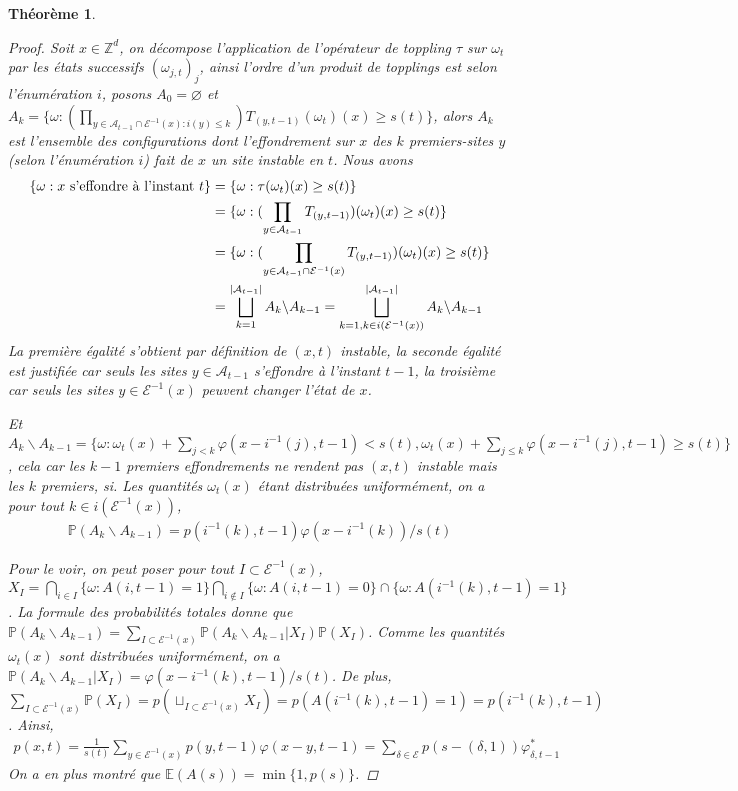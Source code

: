 \documentclass{article}
\newtheorem{theorem}{Théorème}[section]
\begin{document}
\begin{theorem}
\begin{proof}
Soit $x\in\mathbb{Z}^d$, on décompose l'application de l'opérateur de toppling $\tau$ sur $\omega_{t}$ par les états successifs $(\omega_{j,t})_j$, ainsi l'ordre d'un produit de topplings est selon l'énumération $i$, posons $A_0 = \varnothing$ et $A_k = \{\omega : (\prod_{y\in\mathcal{A}_{t-1}\cap\mathcal{E}^{-1}(x) : i(y)\leq k}){T_{(y,t-1)}}(\omega_{t})(x)\geq s(t)\}$, alors $A_k$ est l'ensemble des configurations dont l'effondrement sur $x$ des $k$ premiers-sites $y$ (selon l'énumération $i$) fait de $x$ un site instable en $t$. Nous avons
	\begin{align*}
		\{\omega : x\textup{ s'effondre à l'instant } t\} &= \{\omega : \tau(\omega_t)(x)\geq s(t)\}\\
								  &=\{\omega : (\prod_{y\in \mathcal{A}_{t-1}} T_{(y,t-1)})(\omega_{t})(x)\geq s(t)\}\\
						   &= \{\omega : (\prod_{y\in\mathcal{A}_{t-1} \cap \mathcal{E}^{-1}(x)}T_{(y,t-1)})(\omega_{t})(x)\geq s(t)\}\\
						   &= \bigsqcup_{k=1}^{|\mathcal{A}_{t-1}|}A_k\backslash A_{k-1} = \bigsqcup_{k=1, k\in i(\mathcal{E}^{-1}(x))}^{|\mathcal{A}_{t-1}|}A_k\backslash A_{k-1}  
						 \end{align*}
						 La première égalité s'obtient par définition de $(x,t)$ instable, la seconde égalité est justifiée car seuls les sites $y\in\mathcal{A}_{t-1}$ s'effondre à l'instant $t-1$, la troisième car seuls les sites $y \in \mathcal{E}^{-1}(x)$ peuvent changer l'état de $x$.


						 Et $A_k\backslash A_{k-1} = \{\omega : \omega_{t}(x)+\sum_{j<k}\varphi(x-i^{-1}(j), t-1)<s(t), \omega_{t}(x)+\sum_{j\leq k}\varphi(x-i^{-1}(j), t-1)\geq s(t)\}$, cela car les $k-1$ premiers effondrements ne rendent pas $(x,t)$ instable mais les $k$ premiers, si. Les quantités $\omega_{t}(x)$ étant distribuées uniformément, on a pour tout $k \in i(\mathcal{E}^{-1}(x))$, \begin{align*}\mathbb{P}(A_k\backslash A_{k-1}) = p(i^{-1}(k),t-1)\varphi(x-i^{-1}(k))/s(t)\end{align*}
					 
						 Pour le voir, on peut poser pour tout $I\subset \mathcal{E}^{-1}(x)$, $X_I = \bigcap_{i\in I} \{\omega : A(i,t-1)=1\} \bigcap_{i\notin I}\{\omega : A(i,t-1)=0\}\cap \{\omega : A(i^{-1}(k),t-1)=1\}$. La formule des probabilités totales donne que $\mathbb{P}(A_k\backslash A_{k-1}) = \sum_{I\subset \mathcal{E}^{-1}(x)}\mathbb{P}(A_k\backslash A_{k-1}|X_I)\mathbb{P}(X_I)$. Comme les quantités $\omega_t(x)$ sont distribuées uniformément, on a $\mathbb{P}(A_{k}\backslash A_{k-1}|X_I)=\varphi(x-i^{-1}(k),t-1)/s(t)$. De plus, $\sum_{I\subset \mathcal{E}^{-1}(x)}\mathbb{P}(X_I) = p(\sqcup_{I\subset \mathcal{E}^{-1}(x)} X_I) = p(A(i^{-1}(k),t-1)=1) = p(i^{-1}(k),t-1)$. Ainsi,
						 \begin{align*}
							 p(x,t) = \frac{1}{s(t)}\sum_{y\in \mathcal{E}^{-1}(x)}p(y, t-1)\varphi(x-y,t-1) = \sum_{\delta\in \mathcal{E}}p(s-(\delta, 1))\varphi^*_{\delta, t-1}
						 \end{align*}
						 On a en plus montré que $\mathds{E}(A(s)) = \min\{1, p(s)\}$.
	

\end{proof}
\end{theorem}
\end{document}
